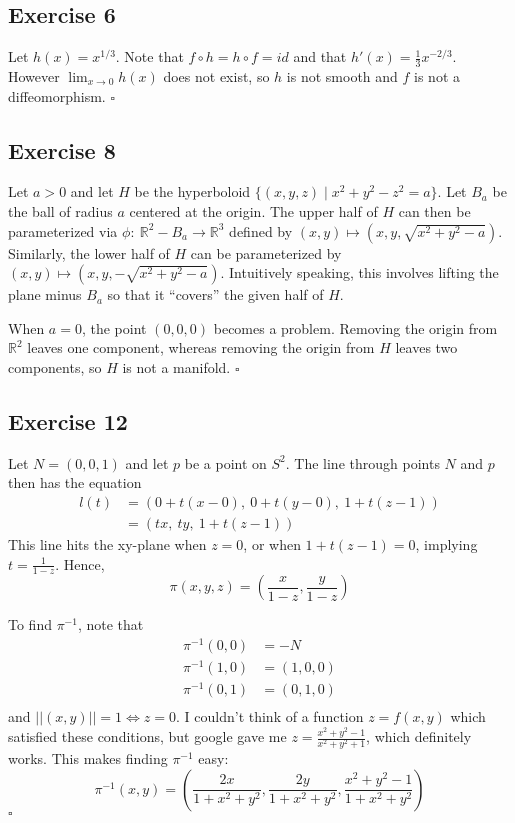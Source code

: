 \documentclass{article}
\begin{document}
\subsection*{Exercise 6}
Let $h(x)=x^{1/3}$. Note that $f \circ h = h \circ f = id$ and that
$h'(x)=\frac{1}{3}x^{-2/3}$. However $\lim_{x \to 0}h(x)$ does not exist,
so $h$ is not smooth and $f$ is not a diffeomorphism.
\hfill $\square$

\subsection*{Exercise 8}
Let $a > 0$ and let $H$ be the hyperboloid $\{(x,y,z) \mid x^2 + y^2 - z^2 = a\}$.
Let $B_a$ be the ball of radius $a$ centered at the origin.
The upper half of $H$ can then be parameterized via
$\phi \colon \ \mathbb{R}^2 - B_a \to \mathbb{R}^3$ defined by
$(x,y) \mapsto (x,y, \sqrt{x^2+y^2-a})$. Similarly, the lower half of $H$ can be
parameterized by $(x,y) \mapsto (x,y, -\sqrt{x^2+y^2-a})$.
Intuitively speaking, this involves lifting the plane minus $B_a$ so that it ``covers'' the given
half of $H$.

When $a=0$, the point $(0,0,0)$ becomes a problem. Removing the origin from
$\mathbb{R}^2$ leaves one component, whereas removing the origin from $H$
leaves two components, so $H$ is not a manifold.
\hfill $\square$

\subsection*{Exercise 12}
Let $N=(0,0,1)$ and let $p$ be a point on $S^2$. The line through points $N$ and $p$
then has the equation
\begin{align*}
l(t)	&=(0+t(x-0),\ 0+t(y-0),\ 1+t(z-1)) \\
	&=(tx,\ ty,\ 1+t(z-1))
\end{align*}
This line hits the xy-plane
when $z=0$, or when $1 + t(z-1)=0$, implying $t = \frac{1}{1-z}$. Hence,
$$\pi(x,y,z) = (\frac{x}{1-z},\frac{y}{1-z})$$

To find $\pi^{-1}$, note that
\begin{align*}
\pi^{-1}(0,0) &= -N\\
\pi^{-1}(1,0) &= (1,0,0)\\
\pi^{-1}(0,1) &= (0,1,0)\\
\end{align*}
and $\vert\vert(x,y)\vert\vert =1 \iff z=0$.
I couldn't think of a function $z=f(x,y)$ which satisfied these conditions, but google gave me
$z=\frac{x^2+y^2-1}{x^2+y^2+1}$, which definitely works. This makes finding $\pi^{-1}$ easy:
$$\pi^{-1}(x,y)=(\frac{2x}{1+x^2+y^2},\frac{2y}{1+x^2+y^2},\frac{x^2+y^2-1}{1+x^2+y^2})$$
\hfill $\square$
\end{document}
